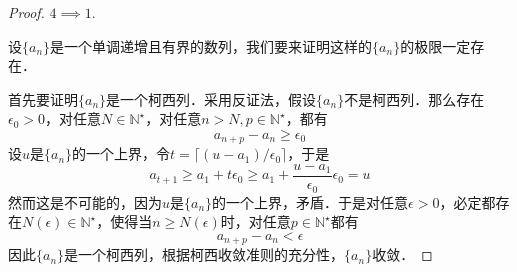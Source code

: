 \documentclass{ctexart}
\theoremstyle{definition}
\theoremstyle{definition}
\theoremstyle{plain}
\theoremstyle{plain}
\theoremstyle{plain}
\theoremstyle{definition}
\newcommand{\nat}{\mathbb{N}^\star}
\begin{document}
\begin{proof}
$4 \implies 1$.

\noindent 设$\{a_n\}$是一个单调递增且有界的数列，我们要来证明这样的$\{a_n\}$的极限一定存在．

\noindent 首先要证明$\{a_n\}$是一个柯西列．采用反证法，假设$\{a_n\}$不是柯西列．那么存在$\epsilon_0 > 0$，对任意$N \in \nat$，对任意$n > N, p \in \nat$，都有
\begin{equation}
    a_{n+p} - a_n \geq \epsilon_0
\end{equation}
设$u$是$\{a_n\}$的一个上界，令$t = \lceil (u - a_1) / \epsilon_0 \rceil$，于是
\begin{equation}
    a_{t+1} \geq a_{1} + t \epsilon_0 \geq a_1 + \frac{u-a_1}{\epsilon_0} \epsilon_0 = u
\end{equation}
然而这是不可能的，因为$u$是$\{a_n\}$的一个上界，矛盾．于是对任意$\epsilon > 0$，必定都存在$N(\epsilon) \in \nat$，使得当$n \geq N(\epsilon)$时，对任意$p \in \nat$都有
\begin{equation}
    a_{n+p} - a_n < \epsilon
\end{equation}
因此$\{a_n\}$是一个柯西列，根据柯西收敛准则的充分性，$\{a_n\}$收敛．

\end{proof}
\end{document}

